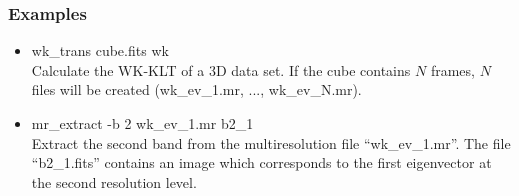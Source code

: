 \subsubsection*{Examples}
\begin{itemize}
\item wk\_trans cube.fits wk \\
Calculate the WK-KLT of a 3D data set. If the cube contains $N$ frames,
$N$ files will be created (wk\_ev\_1.mr, ..., wk\_ev\_N.mr).
\item mr\_extract -b 2 wk\_ev\_1.mr b2\_1  \\
Extract the second band from the multiresolution file ``wk\_ev\_1.mr''.
The file ``b2\_1.fits'' contains an image which
corresponds to the first eigenvector at the second resolution level.
\end{itemize}


